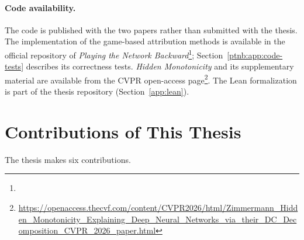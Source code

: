 \paragraph{Code availability.}
The code is published with the two papers rather than submitted with the thesis. The implementation of the game-based attribution methods is available in the official repository of \emph{Playing the Network Backward}\footnote{\coderepo}; Section~\ref{ptnb:app:code-tests} describes its correctness tests. \emph{Hidden Monotonicity} and its supplementary material are available from the CVPR open-access page\footnote{\url{https://openaccess.thecvf.com/content/CVPR2026/html/Zimmermann_Hidden_Monotonicity_Explaining_Deep_Neural_Networks_via_their_DC_Decomposition_CVPR_2026_paper.html}}. The Lean formalization is part of the thesis repository (Section~\ref{app:lean}).

\section{Contributions of This Thesis}\label{sec:contributions}

The thesis makes six contributions.

